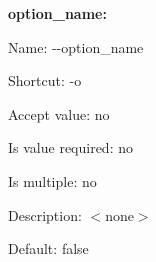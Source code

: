 {\bfseries option\+\_\+name\+:}


\begin{DoxyItemize}
\item Name\+: {\ttfamily -\/-\/option\+\_\+name}
\item Shortcut\+: {\ttfamily -\/o}
\item Accept value\+: no
\item Is value required\+: no
\item Is multiple\+: no
\item Description\+: $<$none$>$
\item Default\+: {\ttfamily false} 
\end{DoxyItemize}